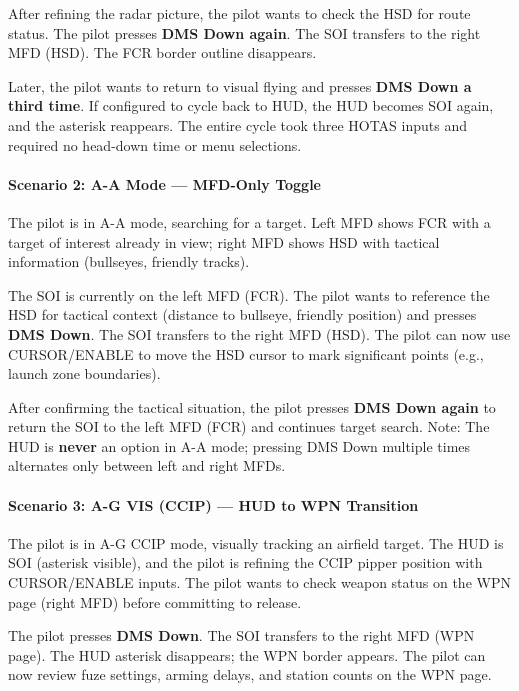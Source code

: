 \documentclass[11pt,a4paper]{article}
\begin{document}
After refining the radar picture, the pilot wants to check the HSD for route status. The pilot presses \textbf{DMS Down again}. The SOI transfers to the right MFD (HSD). The FCR border outline disappears.

Later, the pilot wants to return to visual flying and presses \textbf{DMS Down a third time}. If configured to cycle back to HUD, the HUD becomes SOI again, and the asterisk reappears. The entire cycle took three HOTAS inputs and required no head-down time or menu selections.

\paragraph*{Scenario 2: A-A Mode — MFD-Only Toggle}

The pilot is in A-A mode, searching for a target. Left MFD shows FCR with a target of interest already in view; right MFD shows HSD with tactical information (bullseyes, friendly tracks).

The SOI is currently on the left MFD (FCR). The pilot wants to reference the HSD for tactical context (distance to bullseye, friendly position) and presses \textbf{DMS Down}. The SOI transfers to the right MFD (HSD). The pilot can now use CURSOR/ENABLE to move the HSD cursor to mark significant points (e.g., launch zone boundaries).

After confirming the tactical situation, the pilot presses \textbf{DMS Down again} to return the SOI to the left MFD (FCR) and continues target search. Note: The HUD is \textbf{never} an option in A-A mode; pressing DMS Down multiple times alternates only between left and right MFDs.

\paragraph*{Scenario 3: A-G VIS (CCIP) — HUD to WPN Transition}

The pilot is in A-G CCIP mode, visually tracking an airfield target. The HUD is SOI (asterisk visible), and the pilot is refining the CCIP pipper position with CURSOR/ENABLE inputs. The pilot wants to check weapon status on the WPN page (right MFD) before committing to release.

The pilot presses \textbf{DMS Down}. The SOI transfers to the right MFD (WPN page). The HUD asterisk disappears; the WPN border appears. The pilot can now review fuze settings, arming delays, and station counts on the WPN page.
\end{document}
